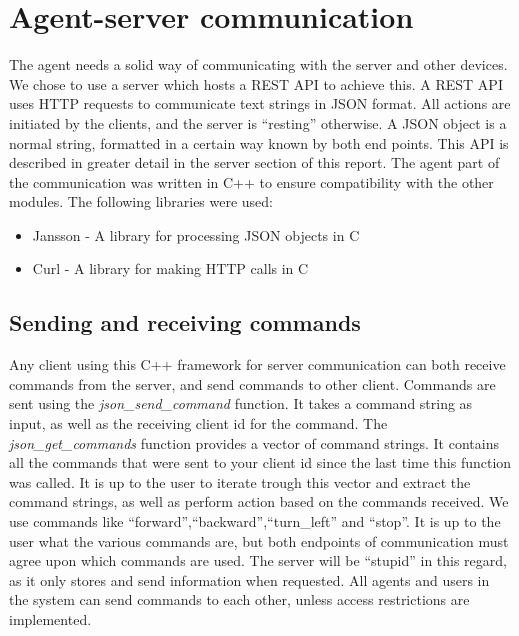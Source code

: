 \section{Agent-server communication}
The agent needs a solid way of communicating with the server and other devices. 
We chose to use a server which hosts a REST API to achieve this. 
A REST API uses HTTP requests to communicate text strings in JSON format.
All actions are initiated by the clients, and the server is ``resting'' otherwise. 
A JSON object is a normal string, formatted in a certain way known by both end points.
This API is described in greater detail in the server section of this report.
The agent part of the communication was written in C++ to ensure compatibility with the other modules.
The following libraries were used:
\begin{itemize}
    \item Jansson - A library for processing JSON objects in C
    \item Curl - A library for making HTTP calls in C
\end{itemize}

\subsection{Sending and receiving commands}
Any client using this C++ framework for server communication can both receive commands from the server, and send commands to other client.
Commands are sent using the \textit{json\_send\_command} function.
It takes a command string as input, as well as the receiving client id for the command.
The \textit{json\_get\_commands} function provides a vector of command strings. It contains all the commands that were sent to your client id since the last time this function was called. 
It is up to the user to iterate trough this vector and extract the command strings, as well as perform action based on the commands received. 
We use commands like ``forward'',``backward'',``turn\_left'' and ``stop''.
It is up to the user what the various commands are, but both endpoints of communication must agree upon which commands are used.
The server will be ``stupid'' in this regard, as it only stores and send information when requested. 
All agents and users in the system can send commands to each other, unless access restrictions are implemented.


